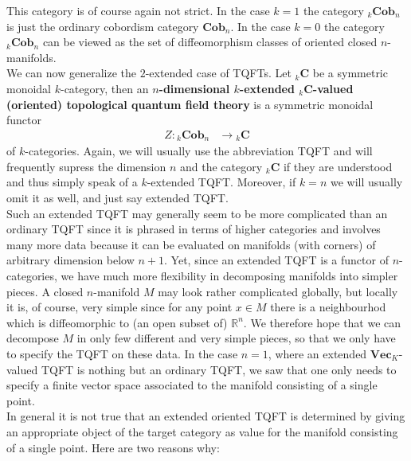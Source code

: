 This category is of course again not strict. In the case $k = 1$ the category ${_{k}}\mathbf{Cob}_{n}$ is just the ordinary cobordism category $\mathbf{Cob}_{n}$. In the case $k = 0$ the category ${_{k}}\mathbf{Cob}_{n}$ can be viewed as the set of diffeomorphism classes of oriented closed $n$-manifolds.
\\
We can now generalize the $2$-extended case of TQFTs. Let ${_{k}}\mathbf{C}$ be a symmetric monoidal $k$-category, then an \textbf{$n$-dimensional $k$-extended ${_{k}}\mathbf{C}$-valued (oriented) topological quantum field theory} is a symmetric monoidal functor
\begin{align*}
  Z
  \colon
  {_{k}}\mathbf{Cob}_{n}
  &\to
  {_{k}}\mathbf{C}
\end{align*}
of $k$-categories. Again, we will usually use the abbreviation TQFT and will frequently supress the dimension $n$ and the category ${_{k}}\mathbf{C}$ if they are understood and thus simply speak of a $k$-extended TQFT. Moreover, if $k = n$ we will usually omit it as well, and just say extended TQFT.
\\
Such an extended TQFT may generally seem to be more complicated than an ordinary TQFT since it is phrased in terms of higher categories and involves many more data because it can be evaluated on manifolds (with corners) of arbitrary dimension below $n+1$. Yet, since an extended TQFT is a functor of $n$-categories, we have much more flexibility in decomposing manifolds into simpler pieces. A closed $n$-manifold $M$ may look rather complicated globally, but locally it is, of course, very simple since for any point $x \in M$ there is a neighbourhod which is diffeomorphic to (an open subset of) $\mathbb{R}^{n}$. We therefore hope that we can decompose $M$ in only few different and very simple pieces, so that we only have to specify the TQFT on these data. In the case $n = 1$, where an extended $\mathbf{Vec}_{K}$-valued TQFT is nothing but an ordinary TQFT, we saw that one only needs to specify a finite vector space associated to the manifold consisting of a single point.
\\
In general it is not true that an extended oriented TQFT is determined by giving an appropriate object of the target category as value for the manifold consisting of a single point. Here are two reasons why:
